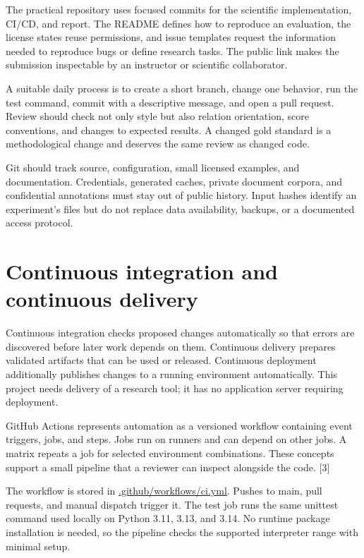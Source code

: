 \documentclass[12pt,a4paper]{article}
\newcommand{\source}[1]{\textnormal{[#1]}}
\newcommand{\link}[2]{\href{#1}{#2}}
\begin{document}
The practical repository uses focused commits for the scientific implementation, CI/CD, and report. The README defines how to reproduce an evaluation, the license states reuse permissions, and issue templates request the information needed to reproduce bugs or define research tasks. The public link makes the submission inspectable by an instructor or scientific collaborator.

A suitable daily process is to create a short branch, change one behavior, run the test command, commit with a descriptive message, and open a pull request. Review should check not only style but also relation orientation, score conventions, and changes to expected results. A changed gold standard is a methodological change and deserves the same review as changed code.

Git should track source, configuration, small licensed examples, and documentation. Credentials, generated caches, private document corpora, and confidential annotations must stay out of public history. Input hashes identify an experiment's files but do not replace data availability, backups, or a documented access protocol.

\clearpage
\section{Continuous integration and continuous delivery}
Continuous integration checks proposed changes automatically so that errors are discovered before later work depends on them. Continuous delivery prepares validated artifacts that can be used or released. Continuous deployment additionally publishes changes to a running environment automatically. This project needs delivery of a research tool; it has no application server requiring deployment.

GitHub Actions represents automation as a versioned workflow containing event triggers, jobs, and steps. Jobs run on runners and can depend on other jobs. A matrix repeats a job for selected environment combinations. These concepts support a small pipeline that a reviewer can inspect alongside the code. \source{3}

The workflow is stored in \link{https://github.com/thgank/taxonomy-evaluator/blob/main/.github/workflows/ci.yml}{.github/workflows/ci.yml}. Pushes to main, pull requests, and manual dispatch trigger it. The test job runs the same unittest command used locally on Python 3.11, 3.13, and 3.14. No runtime package installation is needed, so the pipeline checks the supported interpreter range with minimal setup.
\end{document}
